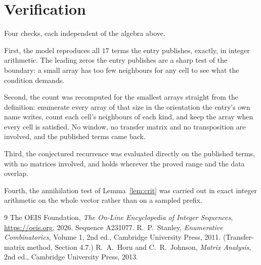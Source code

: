 \documentclass[11pt,a4paper]{article}
\theoremstyle{plain}
\theoremstyle{definition}
\begin{document}
\section{Verification}

Four checks, each independent of the algebra above.

First, the model reproduces all $17$ terms the entry publishes, exactly, in integer
arithmetic. The leading zeros the entry publishes are a sharp test of the boundary: a small
array has too few neighbours for any cell to see what the condition demands.

Second, the count was recomputed for the smallest arrays straight from the definition:
enumerate every array of that size in the orientation the entry's own name writes, count each
cell's neighbours of each kind, and keep the array when every cell is satisfied. No window, no
transfer matrix and no transposition are involved, and the published terms came back.

Third, the conjectured recurrence was evaluated directly on the published terms, with no
matrices involved, and holds wherever the proved range and the data overlap.

Fourth, the annihilation test of Lemma~\ref{lem:crit} was carried out in exact integer
arithmetic on the whole vector rather than on a sampled prefix.

\begin{thebibliography}{9}
 The OEIS Foundation, \emph{The On-Line Encyclopedia of Integer
Sequences}, \url{https://oeis.org}, 2026. Sequence A231077.
 R.~P.~Stanley, \emph{Enumerative Combinatorics}, Volume 1, 2nd ed.,
Cambridge University Press, 2011. (Transfer-matrix method, Section 4.7.)
 R.~A.~Horn and C.~R.~Johnson, \emph{Matrix Analysis}, 2nd ed., Cambridge
University Press, 2013.
\end{thebibliography}
\end{document}
